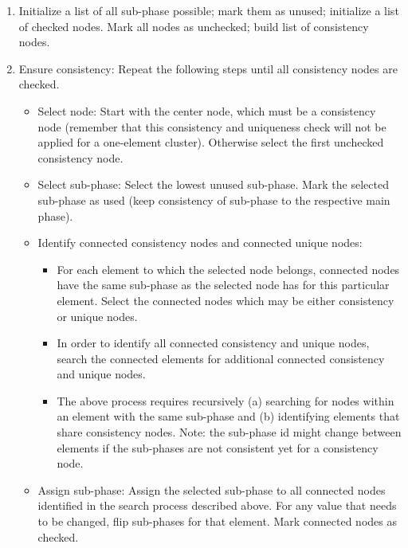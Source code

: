 \begin{enumerate}
\item Initialize a list of all sub-phase possible; mark them as unused; initialize a list of checked nodes. Mark all nodes as unchecked; build list of consistency nodes.
\item Ensure consistency: Repeat the following steps until all consistency nodes are checked.
	\begin{itemize}
	\item Select node: Start with the center node, which must be a consistency node (remember that this consistency and uniqueness check will not be applied for a one-element cluster). Otherwise select the first unchecked consistency node.
	\item Select sub-phase: Select the lowest unused sub-phase. Mark the selected sub-phase as used (keep consistency of sub-phase to the respective main phase).
	\item Identify connected consistency nodes and connected unique nodes:
		\begin{itemize}
		\item For each element to which the selected node belongs, connected nodes have the same sub-phase as the selected node has for this particular element. Select the connected nodes which may be either consistency or unique nodes. 
		\item In order to identify all connected consistency and unique nodes, search the connected elements for additional connected consistency and unique nodes.
		\item The above process requires recursively (a) searching for nodes within an element with the same sub-phase and (b) identifying elements that share consistency nodes. Note: the sub-phase id might change between elements if the sub-phases are not consistent yet for a consistency node.
		\end{itemize}
	\item Assign sub-phase: Assign the selected sub-phase to all connected nodes identified in the search process described above. For any value that needs to be changed, flip sub-phases for that element. Mark connected nodes as checked.
	\end{itemize}


\end{enumerate}
